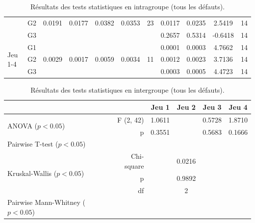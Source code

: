 {\begin{landscape}
\begin{table}[]
\begin{tabular}{ll|ccccc|cccc}
    & G2 & \cellcolor{green!25} 0.0191 & \cellcolor{green!25} 0.0177 & \cellcolor{green!25} 0.0382 & \cellcolor{green!25} 0.0353 & 23 & \cellcolor{green!25} 0.0117 & \cellcolor{green!25} 0.0235 & 2.5419 & 14 \\
    & G3 &  &  &  &  &  & 0.2657 & 0.5314 & -0.6418 & 14 \\ \hline
   \multirow{3}{*}{Jeu 1-4} & G1 &  &  &  &  &  & \cellcolor{green!25} 0.0001 & \cellcolor{green!25} 0.0003 & 4.7662 & 14 \\
    & G2 & \cellcolor{green!25} 0.0029 & \cellcolor{green!25} 0.0017 & \cellcolor{green!25} 0.0059 & \cellcolor{green!25} 0.0034 & 11 & \cellcolor{green!25} 0.0012 & \cellcolor{green!25} 0.0023 & 3.7136 & 14 \\
    & G3 &  &  &  &  &  & \cellcolor{green!25} 0.0003 & \cellcolor{green!25} 0.0005 & 4.4723 & 14
\end{tabular}
\caption{Résultats des tests statistiques en intragroupe (tous les défauts).}
\label{tab:distance_PCA_intra}
\end{table}
\end{landscape}}



\begin{table}[]
    \begin{tabular}{lr|cccc}
        &  & Jeu 1 & Jeu 2 & Jeu 3 & Jeu 4 \\ \hline
       \multirow{2}{*}{ANOVA ($p < 0.05$)} & F (2, 42) & 1.0611 &  & 0.5728 & 1.8710 \\
        & p & 0.3551 &  & 0.5683 & 0.1666 \\ \hline
       \multirow{3}{*}{Pairwise T-test ($p < 0.05$)} &  &  &  &  &  \\
        &  &  &  &  &  \\
        &  &  &  &  &  \\ \hline
       \multirow{3}{*}{Kruskal-Wallis ($p < 0.05$)} & Chi-square &  & 0.0216 &  &  \\
        & p &  & 0.9892 &  &  \\
        & df &  & 2 &  &  \\ \hline
       \multirow{3}{*}{Pairwise Mann-Whitney ($p < 0.05$)} &  &  &  &  &  \\
        &  &  &  &  &  \\
        &  &  &  &  &
    \end{tabular}
\caption{Résultats des tests statistiques en intergroupe (tous les défauts).}
\label{tab:distance_PCA_inter}
\end{table}


